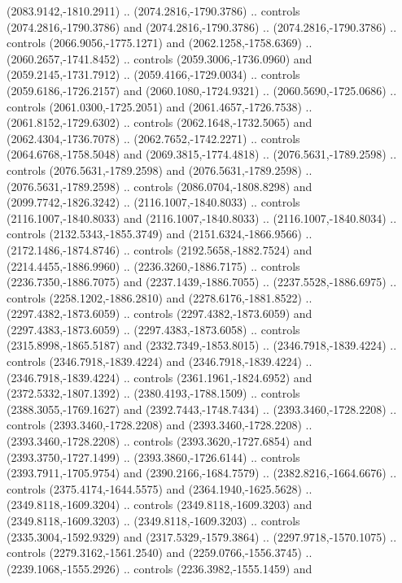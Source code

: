 \begin{scope}[shift={(-24.70323,-217.37029)}]
\begin{scope}[shift={(-1886.1309,2235.3934)}]
\begin{scope}[cm={{0.7306,0.0,0.0,0.7306,(600.13913,-463.70343)}}]
        (2083.9142,-1810.2911) .. (2074.2816,-1790.3786) .. controls
        (2074.2816,-1790.3786) and (2074.2816,-1790.3786) .. (2074.2816,-1790.3786) ..
        controls (2066.9056,-1775.1271) and (2062.1258,-1758.6369) ..
        (2060.2657,-1741.8452) .. controls (2059.3006,-1736.0960) and
        (2059.2145,-1731.7912) .. (2059.4166,-1729.0034) .. controls
        (2059.6186,-1726.2157) and (2060.1080,-1724.9321) .. (2060.5690,-1725.0686) ..
        controls (2061.0300,-1725.2051) and (2061.4657,-1726.7538) ..
        (2061.8152,-1729.6302) .. controls (2062.1648,-1732.5065) and
        (2062.4304,-1736.7078) .. (2062.7652,-1742.2271) .. controls
        (2064.6768,-1758.5048) and (2069.3815,-1774.4818) .. (2076.5631,-1789.2598) ..
        controls (2076.5631,-1789.2598) and (2076.5631,-1789.2598) ..
        (2076.5631,-1789.2598) .. controls (2086.0704,-1808.8298) and
        (2099.7742,-1826.3242) .. (2116.1007,-1840.8033) .. controls
        (2116.1007,-1840.8033) and (2116.1007,-1840.8033) .. (2116.1007,-1840.8034) ..
        controls (2132.5343,-1855.3749) and (2151.6324,-1866.9566) ..
        (2172.1486,-1874.8746) .. controls (2192.5658,-1882.7524) and
        (2214.4455,-1886.9960) .. (2236.3260,-1886.7175) .. controls
        (2236.7350,-1886.7075) and (2237.1439,-1886.7055) .. (2237.5528,-1886.6975) ..
        controls (2258.1202,-1886.2810) and (2278.6176,-1881.8522) ..
        (2297.4382,-1873.6059) .. controls (2297.4382,-1873.6059) and
        (2297.4383,-1873.6059) .. (2297.4383,-1873.6058) .. controls
        (2315.8998,-1865.5187) and (2332.7349,-1853.8015) .. (2346.7918,-1839.4224) ..
        controls (2346.7918,-1839.4224) and (2346.7918,-1839.4224) ..
        (2346.7918,-1839.4224) .. controls (2361.1961,-1824.6952) and
        (2372.5332,-1807.1392) .. (2380.4193,-1788.1509) .. controls
        (2388.3055,-1769.1627) and (2392.7443,-1748.7434) .. (2393.3460,-1728.2208) ..
        controls (2393.3460,-1728.2208) and (2393.3460,-1728.2208) ..
        (2393.3460,-1728.2208) .. controls (2393.3620,-1727.6854) and
        (2393.3750,-1727.1499) .. (2393.3860,-1726.6144) .. controls
        (2393.7911,-1705.9754) and (2390.2166,-1684.7579) .. (2382.8216,-1664.6676) ..
        controls (2375.4174,-1644.5575) and (2364.1940,-1625.5628) ..
        (2349.8118,-1609.3204) .. controls (2349.8118,-1609.3203) and
        (2349.8118,-1609.3203) .. (2349.8118,-1609.3203) .. controls
        (2335.3004,-1592.9329) and (2317.5329,-1579.3864) .. (2297.9718,-1570.1075) ..
        controls (2279.3162,-1561.2540) and (2259.0766,-1556.3745) ..
        (2239.1068,-1555.2926) .. controls (2236.3982,-1555.1459) and

\end{scope}
\end{scope}
\end{scope}
